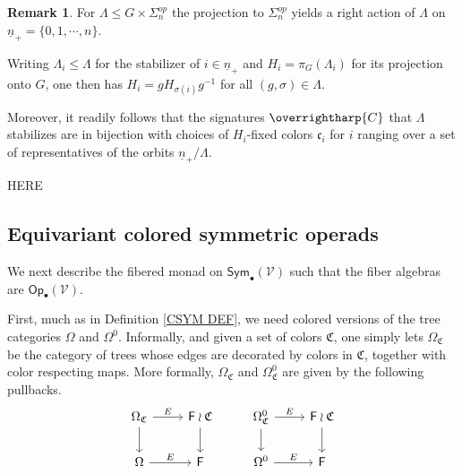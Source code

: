 \documentclass[a4paper,10pt
,draft
]{article}%
\numberwithin{equation}{section}
\numberwithin{figure}{section}
\theoremstyle{definition} %
\newtheorem{remark}[equation]{Remark}%
\newcommand{\vect}[1]{\text{\overrightharp{\ensuremath{#1}}}}
\newcommand{\Fin}{\mathsf{F}}%
\newcommand{\1}{\ensuremath{\mathbbm 1}}%
\newcommand{\OC}{\Omega_{\mathfrak C}}
\begin{document}
\begin{remark}\label{CHOOSESIGN REM}
For $\Lambda \leq G \times \Sigma_n^{op}$ 
the projection to $\Sigma_n^{op}$ yields a
right action of $\Lambda$ on 
$\underline{n}_+ = \{0,1,\cdots,n\}$.

Writing $\Lambda_i\leq \Lambda$ for the stabilizer of $i \in \underline{n}_{+}$ and $H_i = \pi_G(\Lambda_i)$
for its projection onto $G$,
one then has $H_i = g H_{\sigma(i)} g^{-1}$ for all
$(g, \sigma) \in \Lambda$.

Moreover, it readily follows that the 
signatures $\vect{C}$ that $\Lambda$ stabilizes
are in bijection with choices of 
$H_i$-fixed colors $\mathfrak{c}_i$ 
for $i$ ranging over a set of representatives of
the orbits $\underline{n}_+ /\Lambda$.
\end{remark}

{\color{red} HERE}




\subsection{Equivariant colored symmetric operads}


We next describe the fibered monad on $\mathsf{Sym}_\bullet(\mathcal{V})$ such that the fiber algebras are
$\mathsf{Op}_\bullet(\mathcal{V})$.

First, much as in Definition \ref{CSYM DEF}, we need colored versions of the tree categories $\Omega$ and $\Omega^0$.
Informally, and given a set of colors $\mathfrak C$, 
one simply lets $\Omega_{\mathfrak{C}}$
be the category of trees whose edges are decorated by colors in $\mathfrak{C}$, together with color respecting maps.
More formally, $\Omega_{\mathfrak{C}}$ and $\Omega_{\mathfrak C}^0$ are given by the following pullbacks.
\begin{equation}
	\begin{tikzcd}
		\OC \arrow[d] \arrow[r, "E"] &
		\mathsf F \wr \mathfrak C \arrow[d]
                & %
                \Omega_{\mathfrak C}^0 \arrow[r, "E"] \arrow[d]
                &
                \mathsf F \wr \mathfrak C \arrow[d]
\\
		\Omega \arrow[r, "E"] &
		\mathsf F
                & %
                \Omega^0 \arrow[r, "E"]
                &
                \Fin
	\end{tikzcd}
\end{equation}
\end{document}
